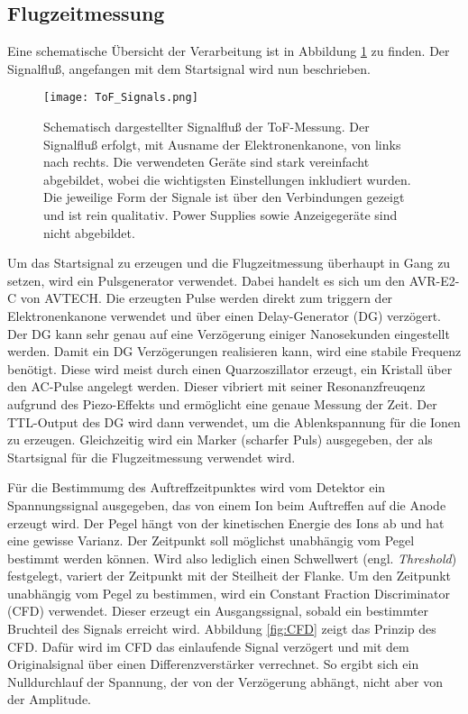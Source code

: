 \subsection{Flugzeitmessung}
Eine schematische Übersicht der Verarbeitung ist in Abbildung \ref{fig:ToF} zu finden. Der Signalfluß, angefangen mit dem Startsignal wird nun beschrieben.

\begin{figure} 
    \centering
    \texttt{[image: ToF\_Signals.png]}
    \caption[Schematisch dargestellter Signalfluß der ToF-Messung]{Schematisch dargestellter Signalfluß der ToF-Messung. Der Signalfluß erfolgt, mit Ausname der Elektronenkanone, von links nach rechts. Die verwendeten Geräte sind stark vereinfacht abgebildet, wobei die wichtigsten Einstellungen inkludiert wurden. Die jeweilige Form der Signale ist über den Verbindungen gezeigt und ist rein qualitativ. Power Supplies sowie Anzeigegeräte sind nicht abgebildet.}
    \label{fig:ToF} 
\end{figure}

Um das Startsignal zu erzeugen und die Flugzeitmessung überhaupt in Gang zu setzen, wird ein Pulsgenerator verwendet. Dabei handelt es sich um den AVR-E2-C von AVTECH. Die erzeugten Pulse werden direkt zum triggern der Elektronenkanone verwendet und über einen Delay-Generator (DG) verzögert. Der DG kann sehr genau auf eine Verzögerung einiger Nanosekunden eingestellt werden. Damit ein DG Verzögerungen realisieren kann, wird eine stabile Frequenz benötigt. Diese wird meist durch einen Quarzoszillator erzeugt, ein Kristall über den AC-Pulse angelegt werden. Dieser vibriert mit seiner Resonanzfreuqenz aufgrund des Piezo-Effekts und ermöglicht eine genaue Messung der Zeit. Der TTL-Output des DG wird dann verwendet, um die Ablenkspannung für die Ionen zu erzeugen. Gleichzeitig wird ein Marker (scharfer Puls) ausgegeben, der als Startsignal für die Flugzeitmessung verwendet wird.

Für die Bestimmumg des Auftreffzeitpunktes wird vom Detektor ein Spannungssignal ausgegeben, das von einem Ion beim Auftreffen auf die Anode erzeugt wird.  Der Pegel hängt von der kinetischen Energie des Ions ab und hat eine gewisse Varianz. Der Zeitpunkt soll möglichst unabhängig vom Pegel bestimmt werden können. Wird also lediglich einen Schwellwert (engl. \textit{Threshold}) festgelegt, variert der Zeitpunkt mit der Steilheit der Flanke. Um den Zeitpunkt unabhängig vom Pegel zu bestimmen, wird ein Constant Fraction Discriminator (CFD) verwendet. Dieser erzeugt ein Ausgangssignal, sobald ein bestimmter Bruchteil des Signals erreicht wird. Abbildung \ref{fig:CFD} zeigt das Prinzip des CFD. Dafür wird im CFD das einlaufende Signal verzögert und mit dem Originalsignal über einen Differenzverstärker verrechnet. So ergibt sich ein Nulldurchlauf der Spannung, der von der Verzögerung abhängt, nicht aber von der Amplitude. 

